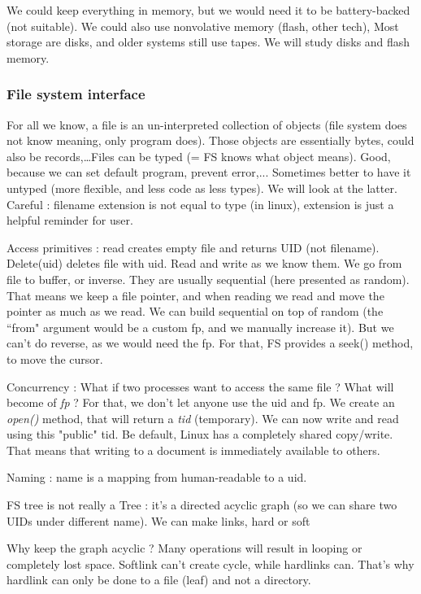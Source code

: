 \documentclass[12pt,a4paper]{article}
\begin{document}
We could keep everything in memory, but we would need it to be battery-backed (not suitable). We could also use nonvolative memory (flash, other tech), Most storage are disks, and older systems still use tapes. We will study disks and flash memory. 

\subsubsection{File system interface}
For all we know, a file is  an un-interpreted collection of objects (file system does not know meaning, only program does). Those objects are essentially bytes, could also be records,\ldots Files can be typed (= FS knows what object means). Good, because we can set default program, prevent error,... Sometimes better to have it untyped (more flexible, and less code as less types). We will look at the latter. Careful : filename extension is not equal to type (in linux), extension is just a helpful reminder for user. 

Access primitives : read creates empty file and returns UID (not filename). Delete(uid) deletes file with uid. Read and write as we know them. We go from file to buffer, or inverse. They are usually sequential (here presented as random). That means we keep a file pointer, and when reading we read and move the pointer as much as we read. We can build sequential on top of random (the ``from" argument would be a custom fp, and we manually increase it). But we can't do reverse, as we would need the fp. For that, FS provides a seek() method, to move the cursor. 

Concurrency : What if two processes want to access the same file ? What will become of \textit{fp} ? For that, we don't let anyone use the uid and fp. We create an \textit{open()} method, that will return a \textit{tid} (temporary). We can now write and read using this "public" tid. Be default, Linux has a completely shared copy/write. That means that writing to a document is immediately available to others. 

Naming : name is a mapping from human-readable to a uid. 


FS tree is not really a Tree : it's a directed acyclic graph (so we can share two UIDs under different name). We can make links, hard or soft

Why keep the graph acyclic ? Many operations will result in looping or completely lost space. Softlink can't create cycle, while hardlinks can. That's why hardlink can only be done to a file (leaf) and not a directory. 
\end{document}
